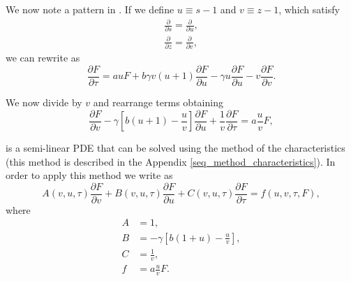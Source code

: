 We now note a pattern in . If we define $u \equiv s - 1$ and $v \equiv z - 1$, which satisfy
\begin{align}
  \frac{\partial}{\partial s} = \frac{\partial}{\partial u},\\
  \frac{\partial}{\partial z} = \frac{\partial}{\partial v},
\end{align}
we can rewrite  as
\begin{equation}
  \frac{\partial F}{\partial \tau} =
  a u F
  + b \gamma v \left( u + 1  \right) \frac{\partial F}{\partial u}
  - \gamma u \frac{\partial F}{\partial u}
  - v \frac{\partial F}{\partial v}.
\end{equation}

We now divide by $v$ and rearrange terms obtaining
\begin{equation}
  \frac{\partial F}{\partial v}
  - \gamma \left[ b (u + 1) - \frac{u}{v} \right] \frac{\partial F}{\partial u}
  + \frac{1}{v} \frac{\partial F}{\partial \tau}
  = a \frac{u}{v} F,
  \label{eq_swain_2}
\end{equation}

\eref[eq_swain_2] is a semi-linear PDE that can be solved using the method of
the characteristics (this method is described in the Appendix
\ref{seq_method_characteristics}). In order to apply this method we write
\eref[eq_swain_2] as
\begin{equation}
  A(v, u, \tau) \frac{\partial F}{\partial v}
  + B(v, u, \tau) \frac{\partial F}{\partial u}
  + C(v, u, \tau) \frac{\partial F}{\partial \tau}
  = f(u, v, \tau, F),
\end{equation}
where
\begin{equation}
  \begin{aligned}
  A &= 1,\\
  B &= - \gamma \left[ b (1 + u) - \frac{u}{v} \right],\\
  C &= \frac{1}{v},\\
  f &= a \frac{u}{v} F.
  \label{eq_coef_definition}
  \end{aligned}
\end{equation}

